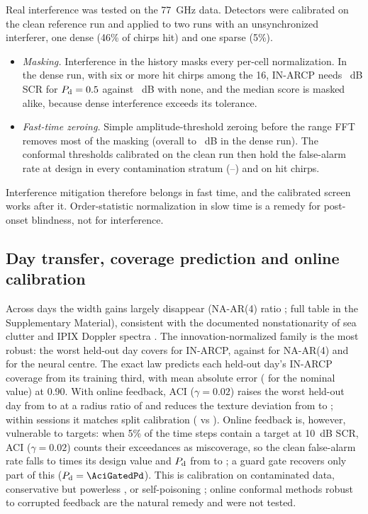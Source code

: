 \documentclass[journal]{IEEEtran}
\begin{document}
Real interference was tested on the 77~GHz data. Detectors were calibrated on the clean reference run and applied to two runs with an unsynchronized interferer, one dense (46\% of chirps hit) and one sparse (5\%).
\begin{itemize}[leftmargin=*,itemsep=1pt]
\item \emph{Masking.} Interference in the history masks every per-cell normalization. In the dense run, with six or more hit chirps among the 16, IN-ARCP needs \JkMaskIN~dB SCR for $P_{\rm d}=0.5$ against \JkCleanIN~dB with none, and the median score is masked alike, because dense interference exceeds its tolerance.
\item \emph{Fast-time zeroing.} Simple amplitude-threshold zeroing before the range FFT removes most of the masking (overall \JkNoZero{} to \JkZero~dB in the dense run). The conformal thresholds calibrated on the clean run then hold the false-alarm rate at design in every contamination stratum (\JkPfaLo--\JkPfaHi) and on hit chirps.
\end{itemize}
Interference mitigation therefore belongs in fast time, and the calibrated screen works after it. Order-statistic normalization in slow time is a remedy for post-onset blindness, not for interference.

\subsection{Day transfer, coverage prediction and online calibration}
Across days the width gains largely disappear (NA-AR(4) ratio \TrRatioNAFour; full table in the Supplementary Material), consistent with the documented nonstationarity of sea clutter and IPIX Doppler spectra \cite{greco2010,rosenberg2017}. The innovation-normalized family is the most robust: the worst held-out day covers \TrWorstINOne{} for IN-ARCP, against \TrWorstNAFour{} for NA-AR(4) and \TrWorstMLP{} for the neural centre. The exact law predicts each held-out day's IN-ARCP coverage from its training third, with mean absolute error \CFiveMaeA{} (\CFiveNaiveA{} for the nominal value) at 0.90. With online feedback, ACI ($\gamma=0.02$) raises the worst held-out day from \ACIWorstSplit{} to \ACIWorst{} at a radius ratio of \ACIRadius{} and reduces the texture deviation from \ACIDevSplit{} to \ACIDev; within sessions it matches split calibration (\ACIWithin{} vs \ACIWithinSplit). Online feedback is, however, vulnerable to targets: when 5\% of the time steps contain a target at 10~dB SCR, ACI ($\gamma=0.02$) counts their exceedances as miscoverage, so the clean false-alarm rate falls to \AciNaivePfa{} times its design value and $P_{\rm d}$ from \AciSplitPd{} to \AciNaivePd; a guard gate recovers only part of this ($P_{\rm d}=\AciGatedPd$). This is calibration on contaminated data, conservative but powerless \cite{clarkson2024contam,bashari2025}, or self-poisoning \cite{balachandran2026}; online conformal methods robust to corrupted feedback \cite{wang2026corrupted} are the natural remedy and were not tested.
\end{document}
